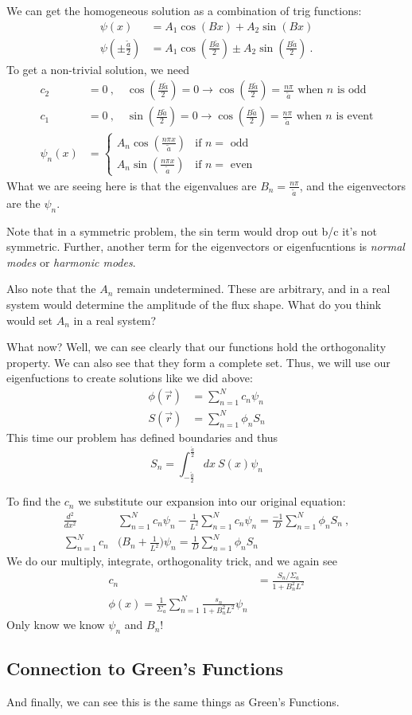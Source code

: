 \documentclass[12pt]{article}
\begin{document}
We can get the homogeneous solution as a combination of trig functions:
\begin{align*}
\psi(x) &= A_1 \cos(Bx) + A_2 \sin(Bx)\\
\psi(\pm \frac{\tilde{a}}{2}) &= A_1 \cos(\frac{B \tilde{a}}{2}) \pm A_2 \sin(\frac{B \tilde{a}}{2}) \:.
\end{align*}
To get a non-trivial solution, we need
\begin{align*}
c_2 &= 0 \:, \quad \cos(\frac{B \tilde{a}}{2}) = 0 \rightarrow \cos(\frac{B \tilde{a}}{2}) = \frac{n \pi}{\tilde{a}} \text{ when }n \text{ is odd}\\
c_1 &= 0 \:, \quad \sin(\frac{B \tilde{a}}{2}) = 0 \rightarrow \cos(\frac{B \tilde{a}}{2}) = \frac{n \pi}{\tilde{a}} \text{ when }n \text{ is event}\\
\psi_n(x) &= 
\left\{
	\begin{array}{ll}
		A_n \cos(\frac{n \pi x}{\tilde{a}})  & \mbox{if } n = \text{ odd} \\
		A_n \sin(\frac{n \pi x}{\tilde{a}}) & \mbox{if } n = \text{ even}
	\end{array}
	\right.
\end{align*}
%
What we are seeing here is that the eigenvalues are $B_n = \frac{n \pi}{\tilde{a}}$, and the eigenvectors are the $\psi_n$. 

Note that in a symmetric problem, the sin term would drop out b/c it's not symmetric. Further, another term for the eigenvectors or eigenfucntions is \textit{normal modes} or \textit{harmonic modes}. 

Also note that the $A_n$ remain undetermined. These are arbitrary, and in a real system would determine the amplitude of the flux shape. What do you think would set $A_n$ in a real system?

What now? Well, we can see clearly that our functions hold the orthogonality property. We can also see that they form a complete set. Thus, we will use our eigenfuctions to create solutions like we did above:
\begin{align*}
\phi(\vec{r}) &= \sum_{n=1}^N c_n \psi_n \\
S(\vec{r}) &= \sum_{n=1}^N \phi_n S_n
\end{align*}
This time our problem has defined boundaries and thus
\[
S_n = \int_{-\frac{\tilde{a}}{2}}^{\frac{\tilde{a}}{2}} dx\: S(x) \psi_n
\]

To find the $c_n$ we substitute our expansion into our original equation:
\begin{align*}
\frac{d^2 }{dx^2} &\sum_{n=1}^N c_n \psi_n - \frac{1}{L^2} \sum_{n=1}^N c_n \psi_n = \frac{-1}{D}\sum_{n=1}^N \phi_n S_n\:,\\
%
\sum_{n=1}^N c_n& \bigl( B_n + \frac{1}{L^2}\bigr)\psi_n = \frac{1}{D}\sum_{n=1}^N \phi_n S_n
\end{align*}
We do our multiply, integrate, orthogonality trick, and we again see
\begin{align*}
c_n &= \frac{S_n / \Sigma_a}{1 + B_n^2  L^2} \\
\phi(x) = \frac{1}{\Sigma_a} \sum_{n=1}^N \frac{s_n}{1 + B_n^2  L^2} \psi_n
\end{align*}
Only know we know $\psi_n$ and $B_n$!


\subsection*{Connection to Green's Functions}
And finally, we can see this is the same things as Green's Functions.
\end{document}
